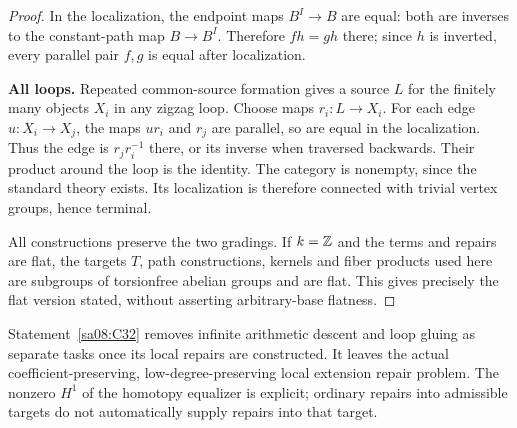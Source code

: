 \begin{proof}
In the localization, the endpoint maps $B^I\to B$ are equal:
both are inverses to the constant-path map $B\to B^I$.
Therefore $fh=gh$ there; since $h$ is inverted, every parallel
pair $f,g$ is equal after localization.

\par\medskip\noindent\textbf{All loops.}
Repeated common-source formation gives a source $L$ for the finitely
many objects $X_i$ in any zigzag loop. Choose maps $r_i:L\to X_i$.
For each edge $u:X_i\to X_j$, the maps $ur_i$ and $r_j$ are
parallel, so are equal in the localization. Thus the edge is
$r_jr_i^{-1}$ there, or its inverse when traversed backwards.
Their product around the loop is the identity. The category is
nonempty, since the standard theory exists. Its localization is
therefore connected with trivial vertex groups, hence terminal.

All constructions preserve the two gradings. If $k=\mathbb Z$ and the
terms and repairs are flat, the targets $T$, path constructions,
kernels and fiber products used here are subgroups of torsionfree
abelian groups and are flat. This gives precisely the flat version
stated, without asserting arbitrary-base flatness.
\end{proof}

Statement~\ref{sa08:C32} removes infinite arithmetic descent and
loop gluing as separate tasks once its local repairs are constructed.
It leaves the actual coefficient-preserving, low-degree-preserving
local extension repair problem. The nonzero $H^1$ of the homotopy
equalizer is explicit; ordinary repairs into admissible targets do
not automatically supply repairs into that target.
